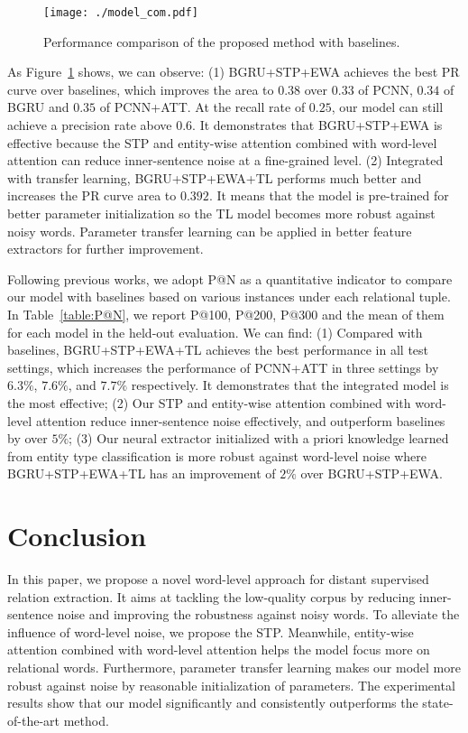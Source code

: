 \documentclass[11pt,a4paper]{article}
\begin{document}
  \begin{figure}[htbp]
    \centering
    \texttt{[image: ./model\_com.pdf]}
    \caption{Performance comparison of the proposed method with baselines.}
    \label{fig:model_com}
  \end{figure}

  As Figure~\ref{fig:model_com} shows, we can observe: (1) BGRU+STP+EWA achieves the best PR curve over baselines, which improves the area to $0.38$ over $0.33$ of PCNN, $0.34$ of BGRU and $0.35$ of PCNN+ATT. At the recall rate of $0.25$, our model can still achieve a precision rate above $0.6$. It demonstrates that BGRU+STP+EWA is effective because the STP and entity-wise attention combined with word-level attention can reduce inner-sentence noise at a fine-grained level. (2) Integrated with transfer learning, BGRU+STP+EWA+TL performs much better and increases the PR curve area to $0.392$. It means that the model is pre-trained for better parameter initialization so the TL model becomes more robust against noisy words. Parameter transfer learning can be applied in better feature extractors for further improvement.

  Following previous works, we adopt P@N as a quantitative indicator to compare our model with baselines based on various instances under each relational tuple. In Table~\ref{table:P@N}, we report P@100, P@200, P@300 and the mean of them for each model in the held-out evaluation. We can find: (1) Compared with baselines, BGRU+STP+EWA+TL achieves the best performance in all test settings, which increases the performance of PCNN+ATT in three settings by $6.3\%$, $7.6\%$, and $7.7\%$ respectively. It demonstrates that the integrated model is the most effective; (2) Our STP and entity-wise attention combined with word-level attention reduce inner-sentence noise effectively, and outperform baselines by over $5\%$; (3) Our neural extractor initialized with a priori knowledge learned from entity type classification is more robust against word-level noise where BGRU+STP+EWA+TL has an improvement of $2\%$ over BGRU+STP+EWA.

\section{Conclusion}
  In this paper, we propose a novel word-level approach for distant supervised relation extraction. It aims at tackling the low-quality corpus by reducing inner-sentence noise and improving the robustness against noisy words. To alleviate the influence of word-level noise, we propose the STP. Meanwhile, entity-wise attention combined with word-level attention helps the model focus more on relational words. Furthermore, parameter transfer learning makes our model more robust against noise by reasonable initialization of parameters. The experimental results show that our model significantly and consistently outperforms the state-of-the-art method.
\end{document}
